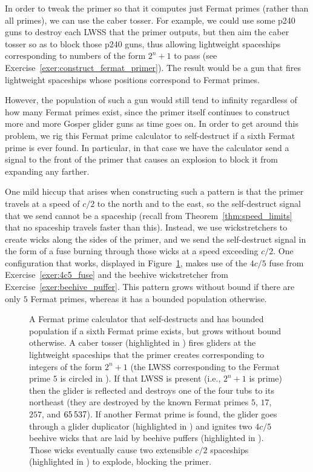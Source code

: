 In order to tweak the primer so that it computes just Fermat primes (rather than all primes), we can use the caber tosser. For example, we could use some p240 guns to destroy each LWSS that the primer outputs, but then aim the caber tosser so as to block those p240 guns, thus allowing lightweight spaceships corresponding to numbers of the form $2^n+1$ to pass (see Exercise~\ref{exer:construct_fermat_primer}). The result would be a gun that fires lightweight spaceships whose positions correspond to Fermat primes.

However, the population of such a gun would still tend to infinity regardless of how many Fermat primes exist, since the primer itself continues to construct more and more Gosper glider guns as time goes on. In order to get around this problem, we rig this Fermat prime calculator to self-destruct if a sixth Fermat prime is ever found. In particular, in that case we have the calculator send a signal to the front of the primer that causes an explosion to block it from expanding any farther.

One mild hiccup that arises when constructing such a pattern is that the primer travels at a speed of $c/2$ to the north and to the east, so the self-destruct signal that we send cannot be a spaceship (recall from Theorem~\ref{thm:speed_limits} that no spaceship travels faster than this). Instead, we use wickstretchers to create wicks along the sides of the primer, and we send the self-destruct signal in the form of a fuse burning through those wicks at a speed exceeding $c/2$. One configuration that works, displayed in Figure~\ref{fig:fermat_primer}, makes use of the $4c/5$ fuse from Exercise~\ref{exer:4c5_fuse} and the beehive wickstretcher from Exercise~\ref{exer:beehive_puffer}. This pattern grows without bound if there are only $5$ Fermat primes, whereas it has a bounded population otherwise.

\begin{figure}[!htbp]
	\centering
	\caption{A Fermat prime calculator that self-destructs and has bounded population if a sixth Fermat prime exists, but grows without bound otherwise. A caber tosser (highlighted in ) fires gliders at the lightweight spaceships that the primer creates corresponding to integers of the form $2^n+1$ (the LWSS corresponding to the Fermat prime $5$ is circled in ). If that LWSS is present (i.e., $2^n+1$ is prime) then the glider is reflected and destroys one of the four tubs to its northeast (they are destroyed by the known Fermat primes $5$, $17$, $257$, and $65{\,}537$). If another Fermat prime is found, the glider goes through a glider duplicator (highlighted in ) and ignites two $4c/5$ beehive wicks that are laid by beehive puffers (highlighted in ). Those wicks eventually cause two extensible $c/2$ spaceships (highlighted in ) to explode, blocking the primer.}\label{fig:fermat_primer}
\end{figure}

